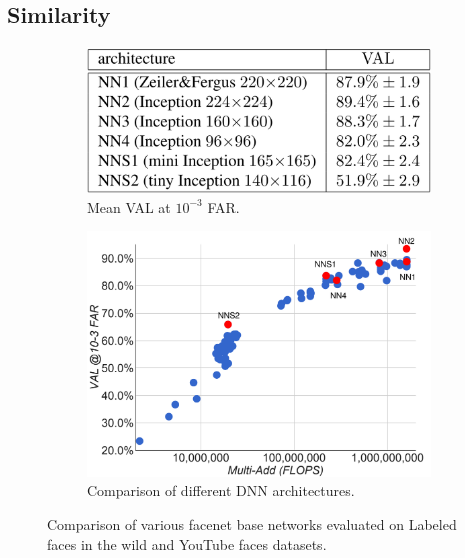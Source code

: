 \documentclass[a4paper,11pt,titlepage,twoside]{article}
\numberwithin{figure}{section}
\begin{document}
\subsection{Similarity}
\label{sec:similarity}

\begin{figure}
    \begin{subfigure}[Sample1]{0.5\linewidth}
    	\includegraphics[width=0.95\linewidth]{fig/facenet_eval_table.png} 
        \caption{Mean VAL at $10^{-3}$ FAR.}
        \label{fig:facenet_table}
    \end{subfigure}
    \quad
    \begin{subfigure}[Sample1]{0.5\linewidth} 
    	\includegraphics[width=0.95\linewidth]{fig/facenet_eval.png}
        \caption{Comparison of different DNN architectures.}   
        \label{fig:triplet_loss}
    \end{subfigure}
    \caption{Comparison of various facenet\cite{szegedy2015going} base networks evaluated on Labeled faces in the wild\cite{huang2007labeled} and YouTube faces\cite{wolf2011face} datasets.}
    \label{fig:facenet}
\end{figure}
\end{document}
